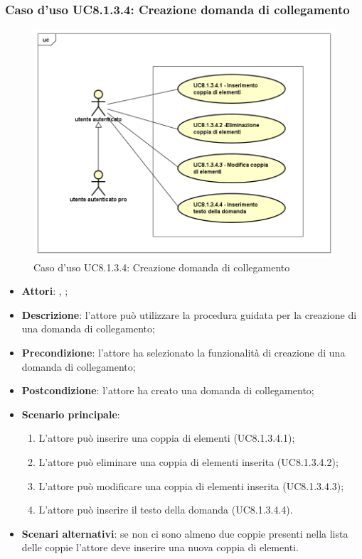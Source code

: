 \subsubsection{Caso d'uso UC8.1.3.4: Creazione domanda di collegamento}
\label{UC8.1.3.4}
\begin{figure}[h]
	\centering
\includegraphics[scale=0.5,keepaspectratio]{UML/UC8_1_3_4.png}
	\caption{Caso d'uso UC8.1.3.4: Creazione domanda di collegamento}
\end{figure}
\FloatBarrier
\begin{itemize}
	\item \textbf{Attori}: \uau, \uaupro;
	\item \textbf{Descrizione}: l'attore può utilizzare la procedura guidata per la creazione di una domanda di collegamento; 
	\item \textbf{Precondizione}: l'attore ha selezionato la funzionalità di creazione di una domanda di collegamento;
	\item \textbf{Postcondizione}: l'attore ha creato una domanda di collegamento;
	\item \textbf{Scenario principale}: 
		\begin{enumerate}
			\item L'attore può inserire una coppia di elementi (UC8.1.3.4.1);
			\item L'attore può eliminare una coppia di elementi inserita (UC8.1.3.4.2);
			\item L'attore può modificare una coppia di elementi inserita (UC8.1.3.4.3);
			\item L'attore può inserire il testo della domanda (UC8.1.3.4.4).
		\end{enumerate}
	\item \textbf{Scenari alternativi}: se non ci sono almeno due coppie presenti nella lista delle coppie l'attore deve inserire una nuova coppia di elementi.
\end{itemize}

